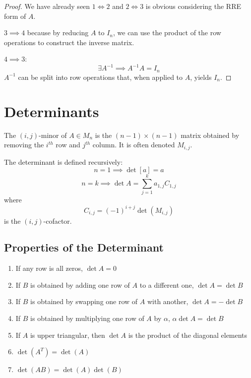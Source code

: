 \documentclass[a4paper,10pt]{article}
\begin{document}
\begin{proof}
	We have already seen $1 \iff 2$ and $2 \iff 3$ is obvious
	considering the RRE form of $A$.

	$3 \implies 4$ because by reducing $A$ to $I_n$, we can use the
	product of the row operations to construct the inverse matrix.

	$4 \implies 3$:
	\[ \exists A^{-1} \implies A^{-1}A = I_n \]
	$A^{-1}$ can be split into row operations that, when applied to
	$A$, yields $I_n$.
\end{proof}

\section{Determinants}

\begin{defn}
	The $(i,j)$-minor of $A \in M_n$ is the $(n-1)\times(n-1)$
	matrix obtained by removing the $i^{th}$ row and $j^{th}$
	column. It is often denoted $M_{i,j}$.
\end{defn}

\begin{defn}[Determinant]
	The determinant is defined recursively:
	\[ n=1 \implies \det [a] = a \]
	\[ n=k \implies \det A = \sum_{j=1}^k a_{1,j} C_{1,j} \]
	where
	\[ C_{i,j} = {(-1)}^{i+j} \det(M_{i,j}) \]
	is the $(i,j)$-cofactor.
\end{defn}

\subsection{Properties of the Determinant}

\begin{enumerate}
	\item
		If any row is all zeros, $\det A = 0$
	\item
		If $B$ is obtained by adding one row of $A$ to a
		different one, $\det A = \det B$
	\item
		If $B$ is obtained by swapping one row of $A$ with
		another, $\det A = -\det B$
	\item
		If $B$ is obtained by multiplying one row of $A$ by
		$\alpha$, $\alpha \det A = \det B$
	\item
		If $A$ is upper triangular, then $\det A$ is the product
		of the diagonal elements
	\item
		$\det(A^T) = \det(A)$
	\item
		$\det(AB) = \det(A) \det(B)$
\end{enumerate}
\end{document}

